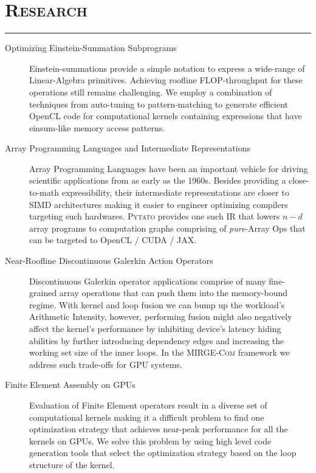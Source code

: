 \documentclass[letterpaper, 13pt]{article}
\begin{document}


\section*{\Large\textsc{Research}}

\vspace{-4ex}
\rule{\textwidth}{0.1ex}
\begin{description}
  \item[Optimizing Einstein-Summation Subprograms] Einstein-summations provide a
    simple notation to express a wide-range of Linear-Algebra primitives.
    Achieving roofline FLOP-throughput for these operations still remains
    challenging. We employ a combination of techniques from auto-tuning to
    pattern-matching to generate efficient OpenCL code for computational
    kernels containing expressions that have einsum-like memory access
    patterns.

  \item[Array Programming Languages and Intermediate Representations] Array
    Programming Languages have been an important vehicle for driving scientific
    applications from as early as the 1960s. Besides providing a close-to-math
    expressibility, their intermediate representations are closer to SIMD
    architectures making it easier to engineer optimizing compilers targeting such
    hardwares.  \textsc{Pytato} provides one such IR that lowers $n-d$ array
    programs to computation graphs comprising of \textit{pure}-Array Ops that can
    be targeted to OpenCL / CUDA / JAX.

  \item[Near-Roofline Discontinuous Galerkin Action Operators] Discontinuous Galerkin operator
    applications comprise of many fine-grained array operations that can push
    them into the memory-bound regime. With kernel and loop fusion we can bump
    up the workload's Arithmetic Intensity, however, performing fusion might
    also negatively affect the kernel's performance by inhibiting device's
    latency hiding abilities by further introducing dependency edges and
    increasing the working set size of the inner loops. In the
    \textsc{MIRGE-Com} framework we address such trade-offs for GPU systems.

  \item[Finite Element Assembly on GPUs] Evaluation of Finite Element operators
    result in a diverse set of computational kernels making it a difficult problem
    to find one optimization strategy that achieves near-peak performance for all
    the kernels on GPUs.  We solve this problem by using high level code
    generation tools that select the optimization strategy based on the loop
    structure of the kernel.
\end{description}
\end{document}
